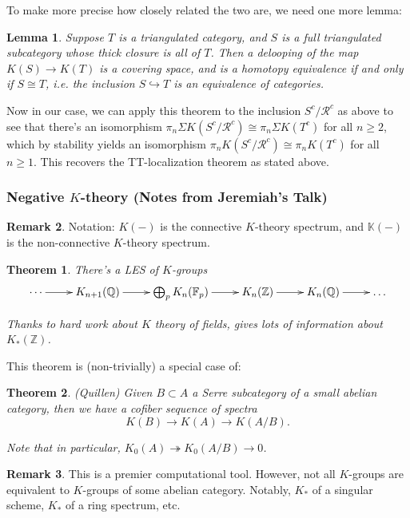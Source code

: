 \documentclass[letterpaper]{article}
\newtheorem{lemma}{Lemma}
\newtheorem{theorem}{Theorem}
\theoremstyle{definition}
\newtheorem{remark}[lemma]{Remark}
\newcommand{\Z}{\mathbb Z}
\newcommand{\mbb}{\mathbb}
\newcommand{\mc}{\mathcal}
\begin{document}
To make more precise how closely related the two are, we need one more lemma:

\begin{lemma}
Suppose $T$ is a triangulated category, and $S$ is a full triangulated
subcategory whose thick closure is all of $T$. Then a delooping of the
map $K(S) \rightarrow K(T)$ is a covering space, and is a homotopy
equivalence if and only if $S \cong T$, i.e. the inclusion $S
\hookrightarrow T$ is an equivalence of categories. 
\end{lemma}

Now in our case, we can apply this theorem to the inclusion $S^c/\mc
R^c$ as above to see that there's an isomorphism $\pi_n\Sigma K(S^c/\mc
R^c)\cong \pi_n \Sigma K(T^c)$ for all $n \geq 2$, which by stability
yields an isomorphism $\pi_n K(S^c/\mc R^c) \cong \pi_n K(T^c)$ for
all $n \geq 1$. This recovers the TT-localization theorem as stated
above. 

\subsubsection{Negative $K$-theory (Notes from Jeremiah's Talk)}
\begin{remark}
Notation: $K(-)$ is the connective $K$-theory spectrum, and $\mbb
K(-)$ is the non-connective $K$-theory spectrum. 
\end{remark}

\begin{theorem}
There's a LES of $K$-groups
\[
\xymatrix{ \cdots \ar[r] & K_{n+1}(\mbb Q) \ar[r] & \bigoplus_{p} K_n(\mbb F_p) \ar[r] &
  K_n(\Z) \ar[r] & K_n(\mbb Q) \ar[r] & \dots}
\]

Thanks to hard work about $K$ theory of fields, gives lots of
information about $K_*(\Z)$.
\end{theorem}

This theorem is (non-trivially) a special case of:

\begin{theorem} (Quillen)
Given $B \subset A$ a Serre subcategory of a small abelian category,
then we have a cofiber sequence of spectra
\[
K(B) \rightarrow K(A) \rightarrow K(A/B).
\]

Note that in particular, $K_0(A) \twoheadrightarrow K_0(A/B)
\rightarrow 0$.
\end{theorem}

\begin{remark}
This is a premier computational tool. However, not all $K$-groups are
equivalent to $K$-groups of some abelian category. Notably, $K_*$ of a
singular scheme, $K_*$ of a ring spectrum, etc. 
\end{remark}
\end{document}
